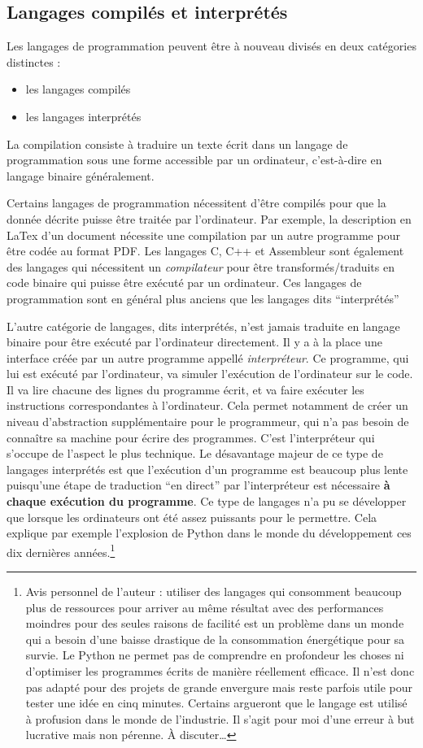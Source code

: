 \documentclass[../../main.tex]{subfiles}
\begin{document}
\subsection{Langages compilés et interprétés}
Les langages de programmation peuvent être à nouveau divisés en deux catégories distinctes :
\begin{itemize}
	\item les langages compilés
	\item les langages interprétés
\end{itemize}
La compilation consiste à traduire un texte écrit dans un langage de programmation sous une forme accessible par un ordinateur, c'est-à-dire en langage binaire généralement.

Certains langages de programmation nécessitent d'être compilés pour que la donnée décrite puisse être traitée par l'ordinateur. Par exemple, la description en LaTex d'un document nécessite une compilation par un autre programme pour être codée au format PDF. Les langages C, C++ et Assembleur sont également des langages qui nécessitent un \textit{compilateur} pour être transformés/traduits en code binaire qui puisse être exécuté par un ordinateur. Ces langages de programmation sont en général plus anciens que les langages dits ``interprétés''

L'autre catégorie de langages, dits interprétés, n'est jamais traduite en langage binaire pour être exécuté par l'ordinateur directement. Il y a à la place une interface créée par un autre programme appellé \textit{interpréteur}. Ce programme, qui lui est exécuté par l'ordinateur, va simuler l'exécution de l'ordinateur sur le code. Il va lire chacune des lignes du programme écrit, et va faire exécuter les instructions correspondantes à l'ordinateur. Cela permet notamment de créer un niveau d'abstraction supplémentaire pour le programmeur, qui n'a pas besoin de connaître sa machine pour écrire des programmes. C'est l'interpréteur qui s'occupe de l'aspect le plus technique. Le désavantage majeur de ce type de langages interprétés est que l'exécution d'un programme est beaucoup plus lente puisqu'une étape de traduction ``en direct'' par l'interpréteur est nécessaire \textbf{à chaque exécution du programme}. Ce type de langages n'a pu se développer que lorsque les ordinateurs ont été assez puissants pour le permettre. Cela explique par exemple l'explosion de Python dans le monde du développement ces dix dernières années.\footnote{Avis personnel de l'auteur : utiliser des langages qui consomment beaucoup plus de ressources pour arriver au même résultat avec des performances moindres pour des seules raisons de facilité est un problème dans un monde qui a besoin d'une baisse drastique de la consommation énergétique pour sa survie. Le Python ne permet pas de comprendre en profondeur les choses ni d'optimiser les programmes écrits de manière réellement efficace. Il n'est donc pas adapté pour des projets de grande envergure mais reste parfois utile pour tester une idée en cinq minutes. Certains argueront que le langage est utilisé à profusion dans le monde de l'industrie. Il s'agit pour moi d'une erreur à but lucrative mais non pérenne. À discuter\dots}
\end{document}
